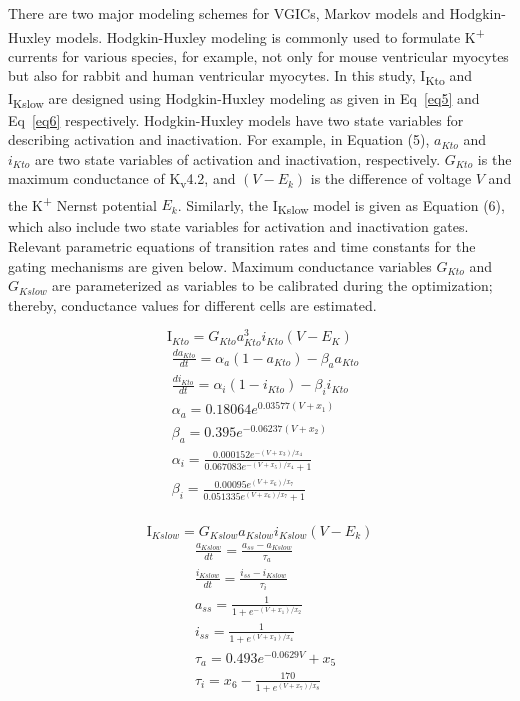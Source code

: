 \documentclass[10pt,letterpaper]{article}
\begin{document}
There are two major modeling schemes for VGICs, Markov models and Hodgkin-Huxley models. Hodgkin-Huxley modeling is commonly used to formulate K\textsuperscript{+} currents for various species, for example, not only for mouse ventricular myocytes but also for rabbit and human ventricular myocytes. In this study, I\textsubscript{Kto} and I\textsubscript{Kslow} are designed using Hodgkin-Huxley modeling as given in Eq~\ref{eq5} and Eq~\ref{eq6} respectively. Hodgkin-Huxley models have two state variables for describing activation and inactivation. For example, in Equation (5), $a_{Kto}$ and $i_{Kto}$ are two state variables of activation and inactivation, respectively. $G_{Kto}$ is the maximum conductance of K\textsubscript{v}4.2, and $(V-E_k)$ is the difference of voltage $V$ and the K\textsuperscript{+} Nernst potential $E_k$. Similarly, the I\textsubscript{Kslow} model is given as Equation (6), which also include two state variables for activation and inactivation gates. Relevant parametric equations of transition rates and time constants for the gating mechanisms are given below. Maximum conductance variables $G_{Kto}$ and $G_{Kslow}$ are parameterized as variables to be calibrated during the optimization; thereby, conductance values for different cells are estimated.

\begin{equation}
    \mathrm{I}_{Kto} = G_{Kto}a_{Kto}^{3}i_{Kto}(V-E_K)
    \label{eq5}
\end{equation}
\begin{align*}
    &\frac{da_{Kto}}{dt} = \alpha_{a}(1-a_{Kto}) - \beta_{a}a_{Kto} \\
    &\frac{di_{Kto}}{dt} = \alpha_i(1-i_{Kto}) - \beta_i i_{Kto} \\
    &\alpha_a = 0.18064 e^{0.03577(V+x_1)} \\
    &\beta_a = 0.395 e^{-0.06237(V+x_2)} \\
    &\alpha_i = \frac{0.000152 e^{-(V+x_3)/x_4}}{0.067083 e^{-(V + x_5)/x_4} + 1} \\
    &\beta_i = \frac{0.00095 e^{(V+x_6)/x_7}}{0.051335 e^{(V+x_6)/x_7} + 1} \\
\end{align*}

\begin{equation}
    \mathrm{I}_{Kslow} = G_{Kslow}a_{Kslow}i_{Kslow}(V-E_k)
    \label{eq6}
\end{equation}
\begin{align*}
    &\frac{a_{Kslow}}{dt} = \frac{a_{ss}-a_{Kslow}}{\tau_{a}} \\
    &\frac{i_{Kslow}}{dt} = \frac{i_{ss}-i_{Kslow}}{\tau_{i}} \\
    &a_{ss} = \frac{1}{1+e^{-(V+x_1)/x_2}} \\
    &i_{ss} = \frac{1}{1+e^{(V+x_3)/x_4}} \\
    &\tau_{a} = 0.493 e^{-0.0629V}+x_5 \\
    &\tau_{i} = x_6 - \frac{170}{1+e^{(V+x_7)/x_8}}
\end{align*}
\end{document}
